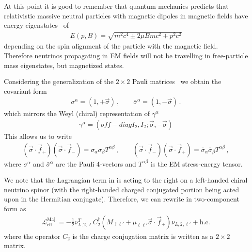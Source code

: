 At this point it is good to remember that quantum mechanics predicts that relativistic massive neutral particles with magnetic dipoles in magnetic fields have energy eigenstates~\cite{Steinmetz:2018ryf} of
\begin{align}
    \label{kgp:1}
    E(p,B) = \sqrt{m^{2}c^{4}\pm2\mu Bmc^{2}+p^{2}c^{2}}
\end{align}
depending on the spin alignment of the particle with the magnetic field. Therefore neutrinos propagating in EM fields will not be travelling in free-particle mass eigenstates, but magnetized states.




Considering the generalization of the $2\times 2$ Pauli matrices~\cite{Ohlsson:2011zz} we obtain the covariant form 
\begin{align}       \label{cross:1a}    
        \sigma^{\alpha}=(1,+\vec{\sigma})\,,\qquad
        \bar\sigma^{\alpha}=(1,-\vec{\sigma})\,.
\end{align}
which mirrors the Weyl (chiral) representation of $\gamma^\alpha$
\begin{align}       \label{cross:1c}    
\gamma^\alpha =(off-diag I_2,I_2;\vec\sigma,-\vec\sigma)
\end{align}
This allows us to write 
        \begin{align}
        \label{cross:2}        \left(\vec{\sigma}\cdot\vec{f}_{+}\right)\left(\vec{\sigma}\cdot\vec{f}_{-}\right)=\sigma_{\alpha}\sigma_{\beta}T^{\alpha\beta}\,,\qquad
        \left(\vec{\sigma}\cdot\vec{f}_{-}\right)\left(\vec{\sigma}\cdot\vec{f}_{+}\right)=\bar\sigma_{\alpha}\bar\sigma_{\beta}T^{\alpha\beta}\,,
\end{align}
where $\sigma^{\alpha}$ and $\bar\sigma^{\alpha}$ are the Pauli 4-vectors and $T^{\alpha\beta}$ is the EM stress-energy tensor.




We note that the Lagrangian term in  is acting to the right on a left-handed chiral neutrino spinor (with the right-handed charged conjugated portion being acted upon in the Hermitian conjugate). Therefore, we can rewrite  in two-component form as
\begin{align}
    \label{massmom:1a}
    \mathcal{L}_\mathrm{eff}^\mathrm{Maj.} = 
    -\frac{1}{2}\nu_{L,2,\ell}^{T}C_{2}^{\dag}\left(M_{\ell\ell'}+\mu_{\ell\ell'}\vec{\sigma}\cdot\vec{f}_{+}\right)\nu_{L,2,\ell'}+\mathrm{h.c.}
\end{align}
where the operator $C_{2}$ is the charge conjugation matrix is written as a $2\times 2$ matrix.




